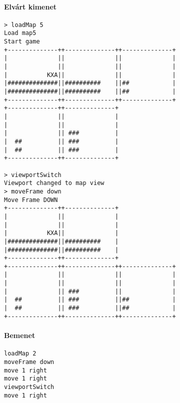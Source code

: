 		        \paragraph*{Elvárt kimenet}
\begin{verbatim}
> loadMap 5
Load map5
Start game
+--------------++--------------++--------------+
|              ||              ||              |
|              ||              ||              |
|           KXA||              ||              |
|##############||##########    ||##            |
|##############||##########    ||##            |
+--------------++--------------++--------------+
+--------------++--------------+                
|              ||              |                
|              ||              |                
|              || ###          |                
|  ##          || ###          |                
|  ##          || ###          |                
+--------------++--------------+                

> viewportSwitch
Viewport changed to map view
> moveFrame down
Move Frame DOWN
+--------------++--------------+                
|              ||              |                
|              ||              |                
|           KXA||              |                
|##############||##########    |                
|##############||##########    |                
+--------------++--------------+                
+--------------++--------------++--------------+
|              ||              ||              |
|              ||              ||              |
|              || ###          ||              |
|  ##          || ###          ||##            |
|  ##          || ###          ||##            |
+--------------++--------------++--------------+
\end{verbatim}

		        \paragraph*{Bemenet}
\begin{verbatim}
loadMap 2
moveFrame down
move 1 right
move 1 right
viewportSwitch
move 1 right
\end{verbatim}
